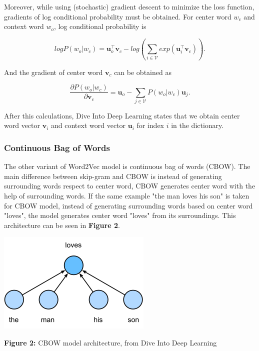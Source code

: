 \documentclass[man]{apa7}
\begin{document}
Moreover, while using (stochastic) gradient descent to minimize the loss function, gradients of log conditional probability must be obtained. For center word $w_c$ and context word $w_o$, log conditional probability is

\begin{equation}
logP(w_o|w_c) = \mathbf{u}_o^\top \mathbf{v}_c - log(\sum_{i \in \mathcal{V}} exp(\mathbf{u}_i^\top \mathbf{v}_c)).
\end{equation}

And the gradient of center word $\mathbf{v}_c$ can be obtained as

\begin{equation}
\frac{\partial P(w_o | w_c)}{\partial \mathbf{v}_c} = \mathbf{u}_o - \sum_{j \in \mathcal{V}} P(w_o|w_c)\mathbf{u}_j.
\end{equation}

After this calculations, Dive Into Deep Learning states that we obtain center word vector $\mathbf{v}_i$ and context word vector $\mathbf{u}_i$ for index $i$ in the dictionary.

\subsubsection{Continuous Bag of Words}
The other variant of Word2Vec model is continuous bag of words (CBOW). The main difference between skip-gram and CBOW is instead of generating surrounding words respect to center word, CBOW generates center word with the help of surrounding words. If the same example "the man loves his son" is taken for CBOW model, instead of generating surrounding words based on center word "loves", the model generates center word "loves" from its surroundings. This architecture can be seen in \textbf{Figure 2}.
\\[2\baselineskip]

\begin{center}
\includegraphics[scale=1]{cbow.png}

\textbf{Figure 2:} CBOW model architecture, from Dive Into Deep Learning\\[2\baselineskip]

\end{center}
\end{document}
